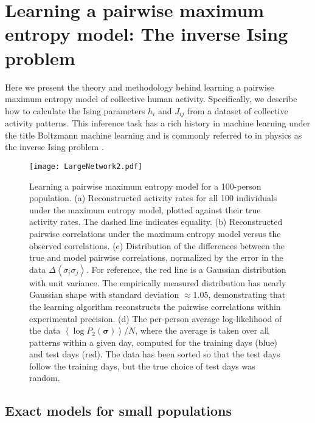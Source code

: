 \documentclass[aps,reprint,superscriptaddress,amsmath,amssymb,longbibliography]{revtex4-1}
\begin{document}
\section{Learning a pairwise maximum entropy model: The inverse Ising problem}

\label{BM}

Here we present the theory and methodology behind learning a pairwise maximum entropy model of collective human activity. Specifically, we describe how to calculate the Ising parameters $h_i$ and $J_{ij}$ from a dataset of collective activity patterns. This inference task has a rich history in machine learning under the title Boltzmann machine learning \cite{Ackley-01} and is commonly referred to in physics as the inverse Ising problem \cite{Aurell-01}.

\begin{figure*}
\texttt{[image: LargeNetwork2.pdf]}
\caption{\label{accuracy} Learning a pairwise maximum entropy model for a 100-person population. (a) Reconstructed activity rates for all 100 individuals under the maximum entropy model, plotted against their true activity rates. The dashed line indicates equality. (b) Reconstructed pairwise correlations under the maximum entropy model versus the observed correlations. (c) Distribution of the differences between the true and model pairwise correlations, normalized by the error in the data $\Delta\left<\sigma_i\sigma_j\right>$. For reference, the red line is a Gaussian distribution with unit variance. The empirically measured distribution has nearly Gaussian shape with standard deviation $\approx 1.05$, demonstrating that the learning algorithm reconstructs the pairwise correlations within experimental precision. (d) The per-person average log-likelihood of the data $\left<\log P_2(\bm{\sigma})\right>/N$, where the average is taken over all patterns within a given day, computed for the training days (blue) and test days (red). The data has been sorted so that the test days follow the training days, but the true choice of test days was random.}
\end{figure*}

\subsection{Exact models for small populations}
\end{document}
